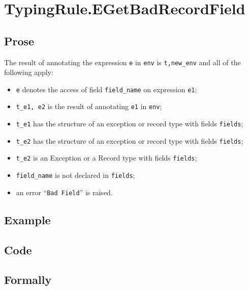 \documentclass{book}
\begin{document}

\section{TypingRule.EGetBadRecordField \label{sec:TypingRule.EGetBadRecordField}}

  \subsection{Prose}
  The result of annotating the expression \texttt{e} in \texttt{env} is
\texttt{t,new\_env} and all of the following apply:
  \begin{itemize}
  \item \texttt{e} denotes the access of field \texttt{field\_name} on expression \texttt{e1};
  \item \texttt{t\_e1, e2} is the result of annotating \texttt{e1} in \texttt{env};
  \item \texttt{t\_e1} has the structure of an exception or record type with fields \texttt{fields};
  \item \texttt{t\_e2} has the structure of an exception or record type with fields \texttt{fields};
  \item \texttt{t\_e2} is an Exception or a Record type with fields \texttt{fields};
  \item \texttt{field\_name} is not declared in \texttt{fields};
  \item an error ``\texttt{Bad Field}'' is raised.
  \end{itemize}

  \subsection{Example}

  \subsection{Code}

\begin{emptyformal}
    \subsection{Formally}
\end{emptyformal}
\end{document}
